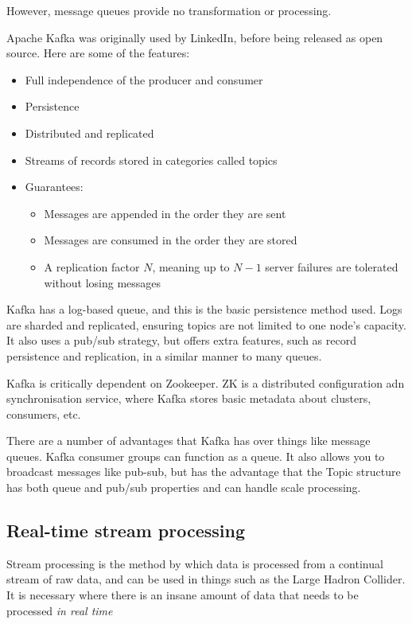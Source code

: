 \documentclass[11pt,a4paper,titlepage,dvipsnames,cmyk]{scrartcl}
\begin{document}
However, message queues provide no transformation or processing.

Apache Kafka was originally used by LinkedIn, before being released as open source. Here are some of the features:
\begin{itemize}
    \item Full independence of the producer and consumer
    \item Persistence
    \item Distributed and replicated
    \item Streams of records stored in categories called topics
    \item Guarantees:
    \begin{itemize}
        \item Messages are appended in the order they are sent
        \item Messages are consumed in the order they are stored
        \item A replication factor $N$, meaning up to $N-1$ server failures are tolerated without losing messages
    \end{itemize}
\end{itemize}

Kafka has a log-based queue, and this is the basic persistence method used. Logs are sharded and replicated, ensuring topics are not limited to one node's capacity. It also uses a pub/sub strategy, but offers extra features, such as record persistence and replication, in a similar manner to many queues.

Kafka is critically dependent on Zookeeper. ZK is a distributed configuration adn synchronisation service, where Kafka stores basic metadata about clusters, consumers, etc.

There are a number of advantages that Kafka has over things like message queues. Kafka consumer groups can function as a queue. It also allows you to broadcast messages like pub-sub, but has the advantage that the Topic structure has both queue and pub/sub properties and can handle scale processing.

\subsection{Real-time stream processing}
Stream processing is the method by which data is processed from a continual stream of raw data, and can be used in things such as the Large Hadron Collider. It is necessary where there is an insane amount of data that needs to be processed \textit{in real time}
\end{document}
